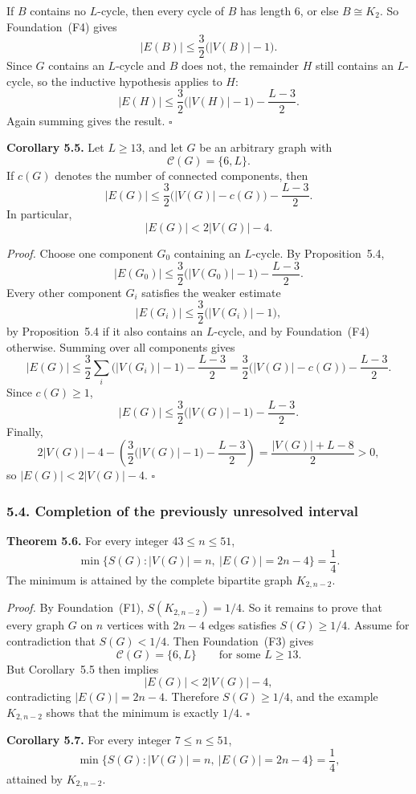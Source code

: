 If $B$ contains no $L$-cycle, then every cycle of $B$ has length $6$, or else $B\cong K_2$.
So Foundation~(F4) gives
\[
|E(B)|\le \frac32\bigl(|V(B)|-1\bigr).
\]
Since $G$ contains an $L$-cycle and $B$ does not, the remainder $H$ still contains an $L$-cycle, so the inductive hypothesis applies to $H$:
\[
|E(H)|\le \frac32\bigl(|V(H)|-1\bigr)-\frac{L-3}{2}.
\]
Again summing gives the result.
\hfill$\square$

\medskip
\textbf{Corollary 5.5.}
Let $L\ge 13$, and let $G$ be an arbitrary graph with
\[
\mathcal C(G)=\{6,L\}.
\]
If $c(G)$ denotes the number of connected components, then
\[
|E(G)|\le \frac32\bigl(|V(G)|-c(G)\bigr)-\frac{L-3}{2}.
\]
In particular,
\[
|E(G)|<2|V(G)|-4.
\]

\medskip
\textit{Proof.}
Choose one component $G_0$ containing an $L$-cycle.
By Proposition~5.4,
\[
|E(G_0)|\le \frac32\bigl(|V(G_0)|-1\bigr)-\frac{L-3}{2}.
\]
Every other component $G_i$ satisfies the weaker estimate
\[
|E(G_i)|\le \frac32\bigl(|V(G_i)|-1\bigr),
\]
by Proposition~5.4 if it also contains an $L$-cycle, and by Foundation~(F4) otherwise.
Summing over all components gives
\[
|E(G)|\le \frac32\sum_i\bigl(|V(G_i)|-1\bigr)-\frac{L-3}{2}
= \frac32\bigl(|V(G)|-c(G)\bigr)-\frac{L-3}{2}.
\]
Since $c(G)\ge 1$,
\[
|E(G)|\le \frac32\bigl(|V(G)|-1\bigr)-\frac{L-3}{2}.
\]
Finally,
\[
2|V(G)|-4-\left(\frac32\bigl(|V(G)|-1\bigr)-\frac{L-3}{2}\right)
=\frac{|V(G)|+L-8}{2}>0,
\]
so $|E(G)|<2|V(G)|-4$.
\hfill$\square$

\subsubsection*{5.4. Completion of the previously unresolved interval}

\textbf{Theorem 5.6.}
For every integer $43\le n\le 51$,
\[
\min\{S(G): |V(G)|=n,\ |E(G)|=2n-4\}=\frac14.
\]
The minimum is attained by the complete bipartite graph $K_{2,n-2}$.

\medskip
\textit{Proof.}
By Foundation~(F1), $S(K_{2,n-2})=1/4$.
So it remains to prove that every graph $G$ on $n$ vertices with $2n-4$ edges satisfies $S(G)\ge 1/4$.
Assume for contradiction that $S(G)<1/4$.
Then Foundation~(F3) gives
\[
\mathcal C(G)=\{6,L\}
\qquad\text{for some }L\ge 13.
\]
But Corollary~5.5 then implies
\[
|E(G)|<2|V(G)|-4,
\]
contradicting $|E(G)|=2n-4$.
Therefore $S(G)\ge 1/4$, and the example $K_{2,n-2}$ shows that the minimum is exactly $1/4$.
\hfill$\square$

\medskip
\textbf{Corollary 5.7.}
For every integer $7\le n\le 51$,
\[
\min\{S(G): |V(G)|=n,\ |E(G)|=2n-4\}=\frac14,
\]
attained by $K_{2,n-2}$.

